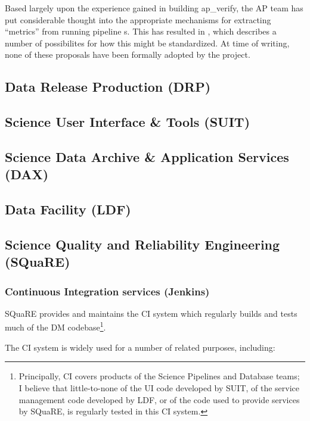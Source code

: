\documentclass[DM,authoryear,toc,lsstdraft]{lsstdoc}
\begin{document}
Based largely upon the experience gained in building ap\_verify, the AP team
has put considerable thought into the appropriate mechanisms for extracting
``metrics'' from running pipeline s. This has resulted in
, which describes a number of possibilites for how this might
be standardized. At time of writing, none of these proposals have been
formally adopted by the project.

\subsection{Data Release Production (DRP)}
\label{sec:current:drp}

\subsection{Science User Interface \& Tools (SUIT)}
\label{sec:current:suit}

\subsection{Science Data Archive \& Application Services (DAX)}
\label{sec:current:dax}

\subsection{Data Facility (LDF)}
\label{sec:current:ldf}

\subsection{Science Quality and Reliability Engineering (SQuaRE)}
\label{sec:current:square}

\subsubsection{Continuous Integration services (Jenkins)}
\label{sec:current:square:ci}

SQuaRE provides and maintains the CI system which regularly builds and
tests much of the DM codebase\footnote{Principally, CI covers products of
the Science Pipelines and Database teams; I believe that little-to-none of the
UI code developed by SUIT, of the service management code developed by LDF, or
of the code used to provide services by SQuaRE, is regularly tested in this CI
system.}.

The CI system is widely used for a number of related purposes, including:
\end{document}
